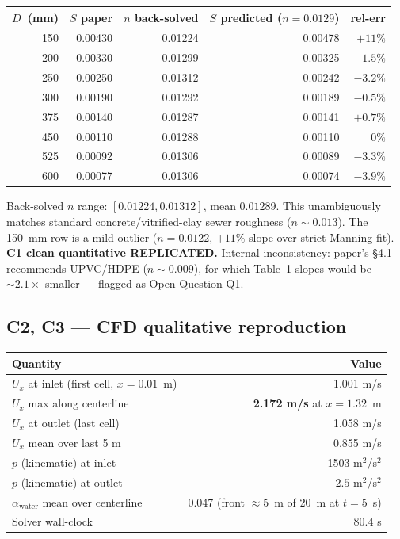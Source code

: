 \documentclass[11pt,a4paper]{article}
\begin{document}
\begin{center}
\begin{tabular}{rrrrr}
\toprule
$D$~(mm) & $S$ paper & $n$ back-solved & $S$ predicted ($n=0.0129$) & rel-err \\
\midrule
150 & 0.00430 & 0.01224 & 0.00478 & $+11\%$ \\
200 & 0.00330 & 0.01299 & 0.00325 & $-1.5\%$ \\
250 & 0.00250 & 0.01312 & 0.00242 & $-3.2\%$ \\
300 & 0.00190 & 0.01292 & 0.00189 & $-0.5\%$ \\
375 & 0.00140 & 0.01287 & 0.00141 & $+0.7\%$ \\
450 & 0.00110 & 0.01288 & 0.00110 & $0\%$ \\
525 & 0.00092 & 0.01306 & 0.00089 & $-3.3\%$ \\
600 & 0.00077 & 0.01306 & 0.00074 & $-3.9\%$ \\
\bottomrule
\end{tabular}
\end{center}

Back-solved $n$ range: $[0.01224, 0.01312]$, mean $0.01289$. This unambiguously matches
standard concrete/vitrified-clay sewer roughness ($n \sim 0.013$). The 150~mm row is a
mild outlier ($n = 0.0122$, $+11\%$ slope over strict-Manning fit). \textbf{C1 clean
quantitative REPLICATED.} Internal inconsistency: paper's \S4.1 recommends UPVC/HDPE
($n\sim 0.009$), for which Table~1 slopes would be $\sim 2.1\times$ smaller --- flagged
as Open Question Q1.

\subsection{C2, C3 --- CFD qualitative reproduction}

\begin{center}
\begin{tabular}{lr}
\toprule
Quantity & Value \\
\midrule
$U_x$ at inlet (first cell, $x=0.01$~m) & 1.001 m/s \\
$U_x$ max along centerline & \textbf{2.172 m/s} at $x=1.32$~m \\
$U_x$ at outlet (last cell) & 1.058 m/s \\
$U_x$ mean over last 5 m & 0.855 m/s \\
$p$ (kinematic) at inlet & 1503 m$^2$/s$^2$ \\
$p$ (kinematic) at outlet & $-2.5$ m$^2$/s$^2$ \\
$\alpha_\mathrm{water}$ mean over centerline & 0.047 (front $\approx 5$~m of 20~m at $t=5$~s) \\
Solver wall-clock & 80.4 s \\
\bottomrule
\end{tabular}
\end{center}
\end{document}
